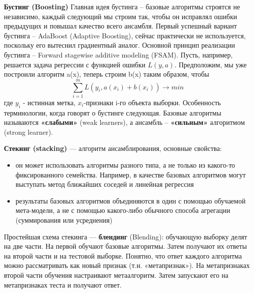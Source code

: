 \textbf{Бустинг (Boosting)}
Главная идея бустинга – базовые алгоритмы строятся не независимо, каждый следующий мы строим так, чтобы он исправлял ошибки предыдущих и повышал качество всего ансамбля. Первый успешный вариант бустинга – AdaBoost (Adaptive Boosting), сейчас практически не используется, поскольку его вытеснил градиентный аналог. Основной принцип реализации бустинга – Forward stagewise additive modeling (FSAM). Пусть, например, решается задача регрессии с функцией ошибки $L(y, a)$. Предположим, мы уже построили алгоритм a(x), теперь строим b(x) таким образом, чтобы
\begin{equation}
    \displaystyle\sum_{i=1}^{m} L(y_i, a(x_i) + b(x_i)) \xrightarrow{} min
\end{equation}
где $y_i$ - истинная метка, $x_i$-признаки i-го объекта выборки.
Особенность терминологии, когда говорят о бустинге следующая. Базовые алгоритмы называются \textbf{«слабыми»} (weak learners),  а ансамбль – \textbf{«сильным»} алгоритмом (strong learner).

\textbf{Стекинг (stacking)} — алгоритм ансамблирования, основные свойства:
\begin{itemize}
    \item он может использовать алгоритмы разного типа, а не только из какого-то фиксированного семейства. Например, в качестве базовых алгоритмов могут выступать метод ближайших соседей и линейная регрессия
    \item результаты базовых алгоритмов объединяются в один с помощью обучаемой мета-модели, а не с помощью какого-либо обычного способа агрегации (суммирования или усреднения)
\end{itemize}
Простейшая схема стекинга — \textbf{блендинг} (Blending): обучающую выборку делят на две части. На первой обучают базовые алгоритмы. Затем получают их ответы на второй части и на тестовой выборке. Понятно, что  ответ каждого алгоритма можно рассматривать как новый признак (т.н. «метапризнак»). На метапризнаках второй части обучения настраивают метаалгоритм. Затем запускают его на метапризнаках теста и получают ответ.


